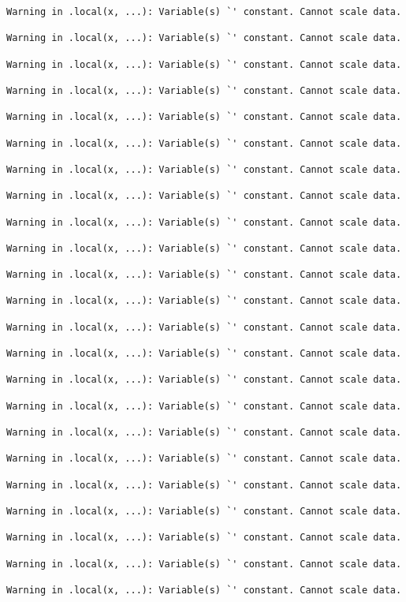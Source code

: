 \documentclass[
  letterpaper,
  DIV=11,
  numbers=noendperiod]{scrartcl}
\begin{document}
\begin{verbatim}
Warning in .local(x, ...): Variable(s) `' constant. Cannot scale data.

Warning in .local(x, ...): Variable(s) `' constant. Cannot scale data.

Warning in .local(x, ...): Variable(s) `' constant. Cannot scale data.

Warning in .local(x, ...): Variable(s) `' constant. Cannot scale data.

Warning in .local(x, ...): Variable(s) `' constant. Cannot scale data.

Warning in .local(x, ...): Variable(s) `' constant. Cannot scale data.

Warning in .local(x, ...): Variable(s) `' constant. Cannot scale data.

Warning in .local(x, ...): Variable(s) `' constant. Cannot scale data.

Warning in .local(x, ...): Variable(s) `' constant. Cannot scale data.

Warning in .local(x, ...): Variable(s) `' constant. Cannot scale data.

Warning in .local(x, ...): Variable(s) `' constant. Cannot scale data.

Warning in .local(x, ...): Variable(s) `' constant. Cannot scale data.

Warning in .local(x, ...): Variable(s) `' constant. Cannot scale data.

Warning in .local(x, ...): Variable(s) `' constant. Cannot scale data.

Warning in .local(x, ...): Variable(s) `' constant. Cannot scale data.

Warning in .local(x, ...): Variable(s) `' constant. Cannot scale data.

Warning in .local(x, ...): Variable(s) `' constant. Cannot scale data.

Warning in .local(x, ...): Variable(s) `' constant. Cannot scale data.

Warning in .local(x, ...): Variable(s) `' constant. Cannot scale data.

Warning in .local(x, ...): Variable(s) `' constant. Cannot scale data.

Warning in .local(x, ...): Variable(s) `' constant. Cannot scale data.

Warning in .local(x, ...): Variable(s) `' constant. Cannot scale data.

Warning in .local(x, ...): Variable(s) `' constant. Cannot scale data.


\end{verbatim}
\end{document}

